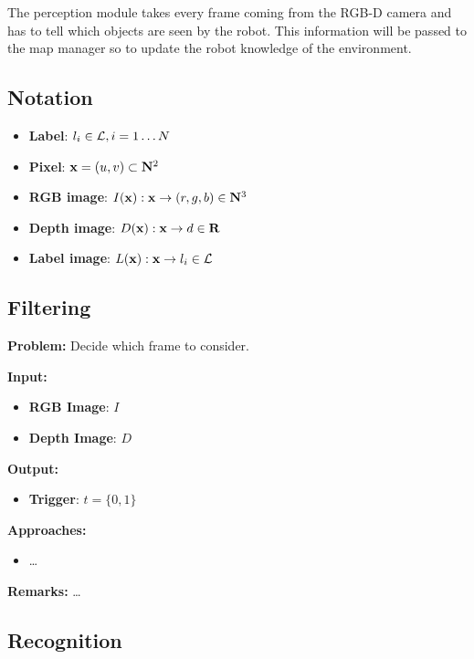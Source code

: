 \documentclass{article}
\begin{document}
	The perception module takes every frame coming from the RGB-D camera and has to tell which objects are seen by the robot. This information will be passed to the map manager so to update the robot knowledge of the environment.
	
	\subsection{Notation}
	
	\begin{itemize}
		\item {\bf Label}: $l_i \in \mathcal{L} , i=1 \dots N$
		\item {\bf Pixel}: $\mathbf{x} = (u,v) \subset \mathbf{N}^2 $
		\item {\bf RGB image}: $I(\mathbf{x}) : \mathbf{x} \rightarrow (r,g,b) \in \mathbf{N}^3$
		\item {\bf Depth image}: $D(\mathbf{x}) : \mathbf{x} \rightarrow d \in \mathbf{R}$		
		\item {\bf Label image}: $L(\mathbf{x}) : \mathbf{x} \rightarrow l_i \in \mathcal{L}$		
	\end{itemize}
	
	\subsection{Filtering}
	
	{\bf Problem: } Decide which frame to consider.

	\noindent
	{\bf Input: }
	\begin{itemize}
		\item {\bf RGB Image}: $I$
		\item {\bf Depth Image}: $D$
	\end{itemize}
	\noindent
	{\bf Output: }
	\begin{itemize}
		\item {\bf Trigger}: $t = \{0,1\}$
	\end{itemize}
	\noindent
	{\bf Approaches: }
	\begin{itemize}
		\item \dots
	\end{itemize}
	\noindent
	{\bf Remarks: } \dots
	
	\subsection{Recognition}
	 
\end{document}
